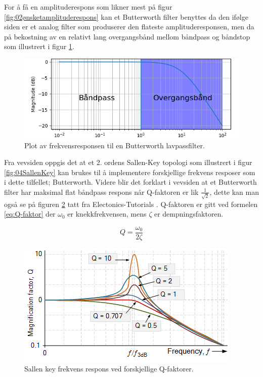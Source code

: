 For å få en amplituderespons som likner mest på figur \ref{fig:02ønsketamplituderespons} kan et Butterworth filter benyttes da den ifølge siden \cite{storr_2013_butterworth} er et analog filter som produserer den flateste amplituderesponsen, men da på bekostning av en relativt lang overgangsbånd mellom båndpass og båndstop som illustrert i figur \ref{fig:03frekvensresponsButterworth}.

\begin{figure}[H]
	\centering
	\includegraphics[scale=0.7]{./Images/02Concept/02filter.png}
	\caption{Plot av frekvensresponsen til en Butterworth lavpassfilter.\cite{pham_2022_selvlaget}}
	\label{fig:03frekvensresponsButterworth}
\end{figure}

Fra vevsiden \cite{electronicstutorials_2021_sallen} oppgis det at et 2. ordens Sallen-Key topologi som illustrert i figur \ref{fig:04SallenKey} kan brukes til å implementere forskjellige frekvens resposer som i dette tilfellet; Butterworth. Videre blir det forklart i vevsiden \cite{wikipediacontributors_2022_sallenkey} at et Butterworth filter har maksimal flat båndpass respons når Q-faktoren er lik $\frac{1}{\sqrt{2}}$, dette kan man også se på figuren \ref{fig:Qfaktor} tatt fra Electonics-Tutorials \cite{electronicstutorials_2021_sallen}. Q-faktoren er gitt ved formelen \ref{eq:Q-faktor} der $\omega_0$ er knekkfrekvensen, mens $\zeta$ er dempningsfaktoren. 

\begin{equation}
	Q=\frac{\omega_0}{2\zeta}
	\label{eq:Q-faktor}
\end{equation}


\begin{figure}[H]
	\centering
	\includegraphics[scale=0.7]{./Images/02Concept/Qfaktor.png}
	\caption{Sallen key frekvens respons ved forskjellige Q-faktorer.\cite{electronicstutorials_2021_sallen}}
	\label{fig:Qfaktor}
\end{figure}


